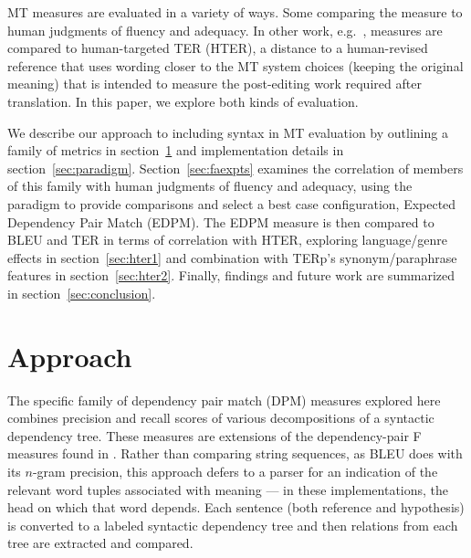 \documentclass{kluwer}    %
\begin{document}
\begin{article}
MT measures are evaluated in a variety of ways. Some
\cite{banerjee05meteor,liu05syntaxformteval,owczarzak07evaluatingmt}
comparing the measure to human
judgments of fluency and adequacy.  In other work, e.g.\
, measures are compared to
human-targeted TER (HTER), a distance to a human-revised reference
that uses wording closer to the MT system choices (keeping the
original meaning) that is intended to measure the post-editing work
required after translation.  In this paper, we explore both kinds of
evaluation.

We describe our approach to including syntax in MT
evaluation by outlining a family of metrics in
section~\ref{sec:approach} and implementation details in
section~\ref{sec:paradigm}.  Section~\ref{sec:faexpts} examines the
correlation of members of this family with human judgments of
fluency and adequacy, using the 
 paradigm to provide comparisons and
select a best case configuration, Expected Dependency Pair Match
(EDPM). The EDPM measure is then compared to BLEU and TER in terms of
correlation with HTER, exploring language/genre effects in
section~\ref{sec:hter1} and combination with TERp's synonym/paraphrase
features in section~\ref{sec:hter2}. Finally, findings and future work
are summarized in section~\ref{sec:conclusion}.

\section{Approach}
\label{sec:approach}


The specific family of dependency pair match (DPM) measures explored here
combines precision and recall scores of various
decompositions of a syntactic dependency tree. These measures are
extensions of the dependency-pair F measures found in
.  Rather than comparing
string sequences, as BLEU does with its $n$-gram precision, this
approach defers to a parser for an indication of the relevant word
tuples associated with meaning --- in these implementations, the head
on which that word depends.  Each sentence (both reference and
hypothesis) is converted to a labeled syntactic dependency tree and
then relations from each tree are extracted and compared.


\end{article}
\end{document}
